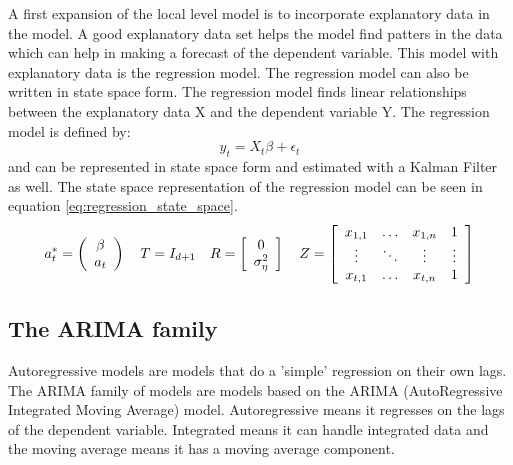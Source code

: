 A first expansion of the local level model is to incorporate explanatory data in the model. A good explanatory data set helps the model find patters in the data which can help in making a forecast of the dependent variable. This model with explanatory data is the regression model.  The regression model can also be written in state space form. The regression model finds linear relationships between the explanatory data X and the dependent variable Y. The regression model is defined by:$$y_t = X_t\beta + \epsilon_t$$ and can be represented in state space form and estimated with a Kalman Filter as well. The state space representation of the regression model can be seen in equation \ref{eq:regression_state_space}.\\

\begin{equation}
    a^*_t = \left(\begin{array}{c} \beta \\ a_t \end{array} \right) \quad
    T = I_{d+1} \quad
    R = \left[\begin{array}{c} 0 \\ \sigma_\eta^2\\\end{array}\right] \quad
    Z = \left[\begin{array}{c c c c}
        x_{1,1} & \hdots & x_{1,n} &  1 \\
        \vdots &  \ddots& \vdots & \vdots \\
        x_{t,1} & \hdots & x_{t,n} & 1 \\
    \end{array}\right]
\label{eq:regression_state_space}
\end{equation}

\subsection{The ARIMA family}
Autoregressive models are models that do a 'simple' regression on their own lags. The ARIMA family of models are models based on the ARIMA (AutoRegressive Integrated Moving Average) model. Autoregressive means it regresses on the lags of the dependent variable. Integrated means it can handle integrated data and the moving average means it has a moving average component.

